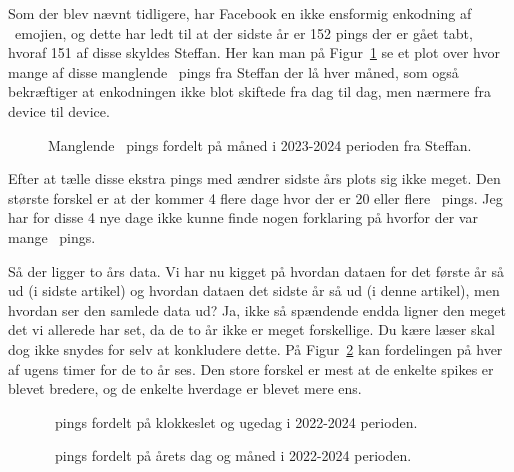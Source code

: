 \begin{article}
Som der blev nævnt tidligere, har Facebook en ikke ensformig enkodning af \coffee\ emojien, og dette har ledt til at der sidste år er 152 pings der er gået tabt, hvoraf 151 af disse skyldes Steffan. Her kan man på Figur~\ref{fig:month_analysis_2022-2023_steffan_missing} se et plot over hvor mange af disse manglende \coffee\ pings fra Steffan der lå hver måned, som også bekræftiger at enkodningen ikke blot skiftede fra dag til dag, men nærmere fra device til device.

\begin{figure}[H]
	\centering
	\resizebox{\columnwidth}{!}{}
	\vspace{-25pt}
	\caption{Manglende \protect\coffee\ pings fordelt på måned i 2023-2024 perioden fra Steffan.}
	\label{fig:month_analysis_2022-2023_steffan_missing}
\end{figure}

Efter at tælle disse ekstra pings med ændrer sidste års plots sig ikke meget. Den største forskel er at der kommer 4 flere dage hvor der er 20 eller flere \coffee\ pings. Jeg har for disse 4 nye dage ikke kunne finde nogen forklaring på hvorfor der var mange \coffee\ pings.


Så der ligger to års data. Vi har nu kigget på hvordan dataen for det første år så ud (i sidste artikel) og hvordan dataen det sidste år så ud (i denne artikel), men hvordan ser den samlede data ud? Ja, ikke så spændende endda ligner den meget det vi allerede har set, da de to år ikke er meget forskellige. Du kære læser skal dog ikke snydes for selv at konkludere dette. På Figur~\ref{fig:weekday_analysis_hour_2022-2024} kan fordelingen på hver af ugens timer for de to år ses. Den store forskel er mest at de enkelte spikes er blevet bredere, og de enkelte hverdage er blevet mere ens.

\begin{figure}[H]
	\centering
	\resizebox{\columnwidth}{!}{}
	\vspace{-25pt}
	\caption{\protect\coffee\ pings fordelt på klokkeslet og ugedag i 2022-2024 perioden.}
	\label{fig:weekday_analysis_hour_2022-2024}
\end{figure}
\begin{figure*}[t!]
	\centering
	\resizebox{2\columnwidth}{!}{}
	\vspace{-20pt}
	\caption{\protect\coffee\ pings fordelt på årets dag og måned i 2022-2024 perioden.}
	\label{fig:year_analysis_2022-2024}
\end{figure*}


\end{article}
